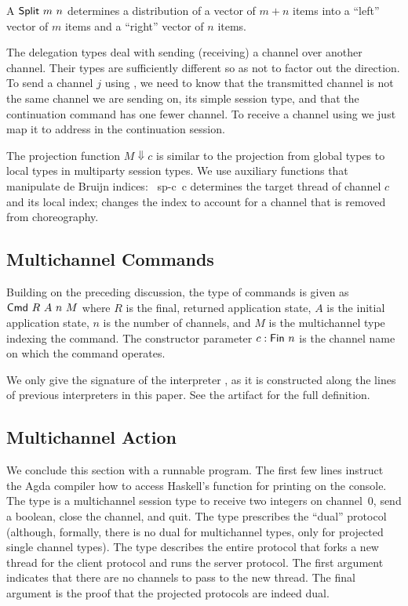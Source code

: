 \documentclass[acmsmall,screen]{acmart}
\begin{document}
A $\ASplit~m~n$ determines a distribution of a vector of $m+n$ items
into a ``left'' vector of $m$ items and a ``right'' vector of $n$ items.
\dataSplit

The delegation types deal with sending (receiving) a channel over
another channel. Their types are sufficiently different so as not to
factor out the direction. To send a channel $j$ using {\ACdelegateOUT}, we need to know that
the transmitted channel is not the same channel we are sending on, its simple session type,
and that the continuation command has one fewer channel.
To receive a channel using {\ACdelegateIN} we just map it to address
{\Azero} in the continuation session.

The projection function $M \Downarrow c$ is similar to the projection from global
types to local types in multiparty session types. We use
auxiliary functions that manipulate de Bruijn indices:
{\AlocateSplit~sp-c~c} determines the target thread of channel $c$ and
its local index; {\Aadjust} changes the index to account for a channel
that is removed from choreography. 
\multiProjection

\subsection{Multichannel Commands}
\label{sec:mult-comm}

Building on the preceding discussion, the type of commands is given as $\ACommand~R~A~n~M$ where
$R$ is the final, returned application state, $A$ is the initial
application state, $n$ is the number of channels, and $M$ is the
multichannel type indexing the command. The constructor parameter $c : \AFin~n$ is
the channel name on which the command operates.

\multiCmd

We only give the signature of the interpreter
{\Aexec}, as it is constructed along the lines of previous
interpreters in this paper. See the artifact for the full definition.

\multiExecSignature

\subsection{Multichannel Action}
\label{sec:multichannel-action}


We conclude this section with a runnable program.
\EXMbody
The first few lines instruct the Agda compiler how to access Haskell's
function {\AputStrLn} for printing on the console.
The type {\Aserverp} is a multichannel session type to receive two integers on channel~0, send a boolean,
close the channel, and quit. The type {\Aclientp} prescribes the ``dual''
protocol (although, formally, there is no dual for multichannel types,
only for projected single channel types). The type {\Aprotocol}
describes the entire protocol that forks a new thread for the client
protocol and runs the server protocol. The first argument {\Anull}
indicates that there are no channels to pass to the new thread. The final argument {\Arefl} is
the proof that the projected protocols are indeed dual.
\end{document}
